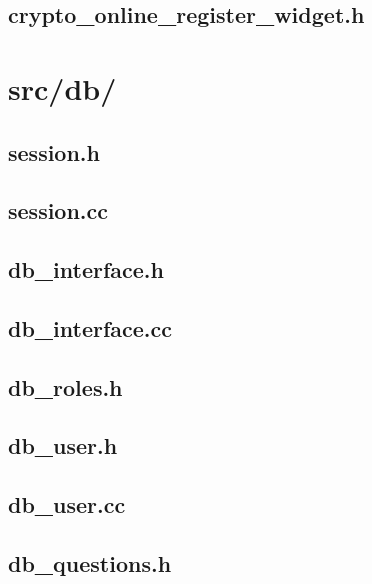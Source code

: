 \subsection{crypto_online_register_widget.h}

\newpage

\section{src/db/}

\subsection{session.h}

\newpage

\subsection{session.cc}

\newpage

\subsection{db_interface.h}

\newpage

\subsection{db_interface.cc}

\newpage

\subsection{db_roles.h}

\newpage

\subsection{db_user.h}

\newpage

\subsection{db_user.cc}

\newpage

\subsection{db_questions.h}

\newpage

